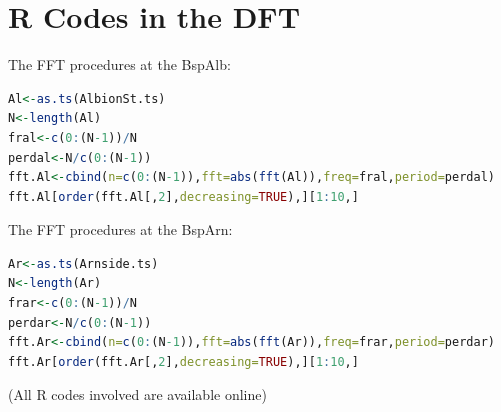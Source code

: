 \documentclass[12pt,msc]{uom_eee_dissertation_casson}
\begin{document}
\chapter{R Codes in the DFT}
\label{app:dft-codes}
The FFT procedures at the BspAlb:
\begin{lstlisting}[language=R,breaklines=true]
Al<-as.ts(AlbionSt.ts)
N<-length(Al)
fral<-c(0:(N-1))/N
perdal<-N/c(0:(N-1))
fft.Al<-cbind(n=c(0:(N-1)),fft=abs(fft(Al)),freq=fral,period=perdal)
fft.Al[order(fft.Al[,2],decreasing=TRUE),][1:10,]
\end{lstlisting}
The FFT procedures at the BspArn:
\begin{lstlisting}[language=R,breaklines=true]
Ar<-as.ts(Arnside.ts)
N<-length(Ar)
frar<-c(0:(N-1))/N
perdar<-N/c(0:(N-1))
fft.Ar<-cbind(n=c(0:(N-1)),fft=abs(fft(Ar)),freq=frar,period=perdar)
fft.Ar[order(fft.Ar[,2],decreasing=TRUE),][1:10,]
\end{lstlisting}
\endgroup
(All R codes involved are available online)
\end{document}
